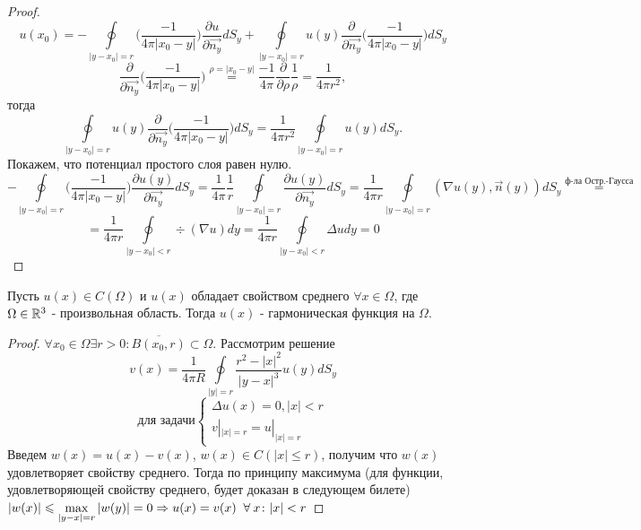 \begin{proof}
$$u(x_0)= -\oint\limits_{|y-x_0|=r} \bigg( \frac{-1}{4\pi |x_0-y|} \bigg) \frac{\partial u}{\partial \vec{n_y}} dS_y + \oint\limits_{|y-x_0|=r} u(y) \frac{\partial}{\partial \vec{n_y}} \bigg(\frac{-1}{4\pi |x_0-y|}\bigg) dS_y $$
$$\frac{\partial}{\partial \vec{n_y}} \bigg(\frac{-1}{4\pi |x_0-y|}\bigg)\stackrel{\rho = |x_0 - y|}{=} \frac{-1}{4\pi}\frac{\partial}{\partial \rho}\frac{1}{\rho} = \frac{1}{4 \pi r^2},$$ тогда $$\oint\limits_{|y-x_0|=r} u(y) \frac{\partial}{\partial \vec{n_y}} \bigg(\frac{-1}{4\pi |x_0-y|}\bigg) dS_y = \frac{1}{4 \pi r^2} \oint\limits_{|y-x_0|=r} u(y) dS_y.$$
Покажем, что потенциал простого слоя равен нулю.
\[ -\oint\limits_{|y-x_0|=r} \bigg( \frac{-1}{4\pi |x_0-y|} \bigg) \frac{\partial u(y)}{\partial \vec{n_y}} dS_y = \frac{1}{4\pi} \frac{1}{r} \oint\limits_{|y-x_0|=r}  \frac{\partial u(y)}{\partial \vec{n_y}} dS_y = \frac{1}{4\pi r} \oint\limits_{|y-x_0|=r} (\nabla u(y), \vec{n}(y)) dS_y \stackrel{\text{ф-ла Остр.-Гаусса}}{=}
\]
\[
 = \frac{1}{4\pi r} \oint\limits_{|y-x_0|<r} \div(\nabla u) dy = \frac{1}{4\pi r} \oint\limits_{|y-x_0|<r} \Delta u dy  = 0
 \]
\end{proof}
\begin{theorem}
Пусть $u(x) \in C(\Omega)$ и $u(x)$ обладает свойством среднего $\forall x \in \Omega$, где $\Omega \in \mathbb{R}^3$ - произвольная область. Тогда $u(x)$ - гармоническая функция на $\Omega$. 
\end{theorem}
\begin{proof}
$\forall x_0\in\Omega\exists r > 0: \overline{B(x_0, r)}\subset\Omega.$ 
Рассмотрим решение $$v(x) = \frac{1}{4\pi R}\oint\limits_{|y|=r}\frac{r^2-|x|^2}{|y-x|^3}u(y)dS_y $$ 
$$\text{для задачи} \begin{cases}
\Delta u(x) = 0, |x| < r \\
v|_{|x| = r} = u|_{|x| = r}
\end{cases} $$
Введем $w(x) = u(x) - v(x)$, $w(x) \in C(|x| \leq r)$, получим что $w(x)$ удовлетворяет свойству среднего. Тогда по принципу максимума (для функции, удовлетворяющей свойству среднего, будет доказан в следующем билете) $|w(x)| \leqslant \max\limits_{|y-x| = r}|w(y)| = 0  \Rightarrow u(x) = v(x) \;\;\forall\: x\colon |x| < r$
\end{proof}